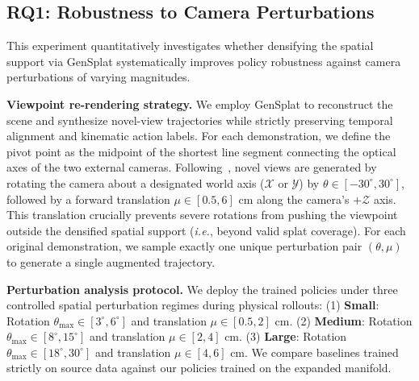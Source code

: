 \subsection{RQ1: Robustness to Camera Perturbations}
\label{sec:Robustness to Camera Perturbations}
This experiment quantitatively investigates whether densifying the spatial support via GenSplat systematically improves policy robustness against camera perturbations of varying magnitudes.

\noindent \textbf{Viewpoint re-rendering strategy.}
We employ GenSplat to reconstruct the scene and synthesize novel-view trajectories while strictly preserving temporal alignment and kinematic action labels. For each demonstration, we define the pivot point as the midpoint of the shortest line segment connecting the optical axes of the two external cameras. 
Following~\cite{tian2024view,shi2025nvspolicy}, novel views are generated by rotating the camera about a designated world axis ($\mathcal{X}$ or $\mathcal{Y}$) by $\theta \in [-30^\circ, 30^\circ]$, followed by a forward translation $\mu \in [0.5, 6]$ cm along the camera's $+\mathcal{Z}$ axis. This translation crucially prevents severe rotations from pushing the viewpoint outside the densified spatial support (\textit{i.e.}, beyond valid splat coverage). For each original demonstration, we sample exactly one unique perturbation pair $(\theta,\mu)$ to generate a single augmented trajectory.


\noindent \textbf{Perturbation analysis protocol.}
We deploy the trained policies under three controlled spatial perturbation regimes during physical rollouts: 
(1) \textbf{Small}: Rotation $\theta_{\max}\in[3^\circ,6^\circ]$ and translation $\mu\in[0.5,2]$ cm. 
(2) \textbf{Medium}: Rotation $\theta_{\max}\in[8^\circ,15^\circ]$ and translation $\mu\in[2,4]$ cm. 
(3) \textbf{Large}: Rotation $\theta_{\max}\in[18^\circ,30^\circ]$ and translation $\mu\in[4,6]$ cm. We compare baselines trained strictly on source data against our policies trained on the expanded manifold.

